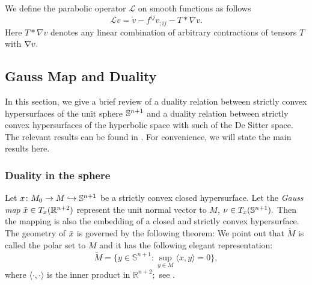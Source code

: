 

We define the parabolic operator $\mathcal{L}$ on smooth functions as follows
\[\mathcal{L}v=\dot{v}-f^{ij}v_{;ij}-T\ast\nabla v.\]
Here $T\ast \nabla v$ denotes  any linear combination of arbitrary contractions of tensors $T$ with $\n v.$
\subsection{Gauss Map and Duality}\label{Duality}
\label{gauss_duality}
In this section, we give a brief review of a duality relation between strictly convex hypersurfaces of the unit sphere $\S^{n+1}$ and a duality relation between strictly convex hypersurfaces of the hyperbolic space with such of the De Sitter space. The relevant results can be found in \cite[Ch.~9, 10]{Gerhardt:/2006}. For convenience, we will state the main results here.
\subsubsection*{Duality in the sphere}
Let $x\cn M_0\ra M\hra \S^{n+1}$ be a strictly convex closed hypersurface. Let the {\it{Gauss map}} $\~x\in T_x(\R^{n+2})$ represent the unit normal vector to $M$, $\nu\in T_x(\S^{n+1}).$ Then the mapping
is also the embedding of a closed and strictly convex hypersurface. The geometry of $\~x$ is governed by the following theorem:
We point out that $\tilde{M}$ is called the polar set to $M$ and it has the following elegant representation:
$$\tilde{M}=\{y\in \mathbb{S}^{n+1}: \sup_{y\in M}\langle x,y\rangle=0\},$$
where $\langle \cdot,\cdot\rangle$ is the inner product in $\mathbb{R}^{n+2};$ see \cite[Thm.~9.2.9]{Gerhardt:/2006}.
